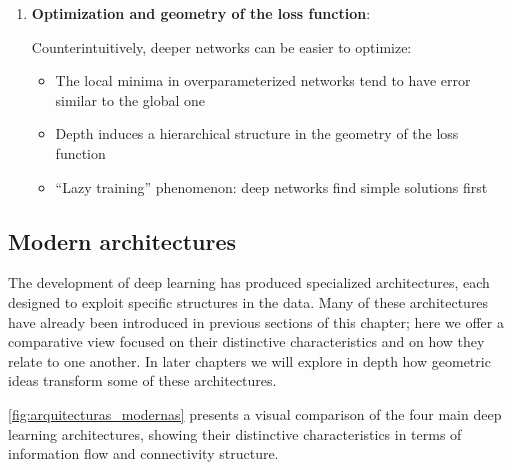\begin{enumerate}
	\item \textbf{Optimization and geometry of the loss function}:

	Counterintuitively, deeper networks can be easier to optimize:

	\begin{itemize}
		\item The local minima in overparameterized networks tend to have error similar to the global one
		\item Depth induces a hierarchical structure in the geometry of the loss function
		\item ``Lazy training'' phenomenon: deep networks find simple solutions first
	\end{itemize}
\end{enumerate}

\subsection{Modern architectures}

The development of deep learning has produced specialized architectures, each designed to exploit specific structures in the data. Many of these architectures have already been introduced in previous sections of this chapter; here we offer a comparative view focused on their distinctive characteristics and on how they relate to one another. In later chapters we will explore in depth how geometric ideas transform some of these architectures.

\autoref{fig:arquitecturas_modernas} presents a visual comparison of the four main deep learning architectures, showing their distinctive characteristics in terms of information flow and connectivity structure.

